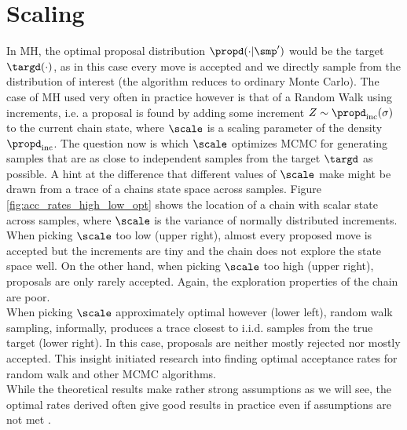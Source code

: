 \section{Scaling}
\label{sec:mcmc_scaling}
In MH, the optimal proposal distribution $\propd(\cdot|\smp')$ would be the target $\targd(\cdot)$, as in this case every move is accepted and we directly sample from the distribution of interest (the algorithm reduces to ordinary Monte Carlo). The case of MH used very often in practice however is that of a Random Walk using increments, i.e. a proposal is found by adding some increment $Z \sim \propd_\textrm{inc}(\sigma)$ to the current chain state, where $\scale$ is a scaling parameter of the density $\propd_\textrm{inc}$. The question now is which $\scale$ optimizes MCMC for generating samples that are as close to independent samples from the target $\targd$ as possible. A hint at the difference that different values of $\scale$ make might be drawn from a trace of a chains state space across samples. Figure \ref{fig:acc_rates_high_low_opt} shows the location of a chain with scalar state across samples, where  $\scale$ is the variance of normally distributed increments. When picking $\scale$ too low (upper right), almost every proposed move is accepted but the increments are tiny and the chain does not explore the state space well. On the other hand, when picking $\scale$ too high (upper right), proposals are only rarely accepted. Again, the exploration properties of the chain are poor.\\
When picking $\scale$ approximately optimal however (lower left), random walk sampling, informally, produces a trace closest to i.i.d. samples from the true target (lower right). In this case, proposals are neither mostly rejected nor mostly accepted. This insight initiated research into finding optimal acceptance rates for random walk and other MCMC algorithms.\\
While the theoretical results make rather strong assumptions as we will see, the optimal rates derived often give good results in practice even if assumptions are not met \cite{Rosenthal2011}.

